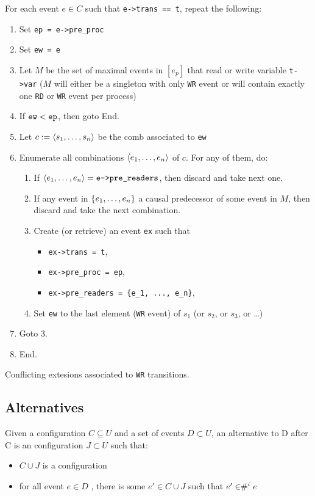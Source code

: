 \documentclass{llncs}
\begin{document}
\begin{algorithm}
\noindent
For each event $e \in C$ such that \verb!e->trans == t!, repeat the following:
\begin{enumerate}
\item Set \verb!ep = e->pre_proc!
\item Set \verb!ew = e!
\item
  Let $M$ be the set of maximal events in $[e_p]$ that read or write variable
  \verb!t->var! ($M$ will either be a singleton with only \verb!WR! event or
  will contain exactly one \verb!RD! or \verb!WR! event per process)
\item If $\verb!ew! < \verb!ep!$, then goto End.
\item Let $c \mathrel{:=} \langle s_1, \ldots, s_n\rangle$ be the comb associated to \verb!ew!
\item
  Enumerate all combinations $\langle e_1, \ldots, e_n\rangle$ of $c$.
  For any of them, do:
  \begin{enumerate}
  \item
    If $\tup{e_1, \ldots, e_n} = \verb!e->pre_readers!$, then discard and take
    next one.
  \item
    If any event in ${\{ e_1, \ldots, e_n \mathclose \}}$ a causal predecessor of some event in
    $M$, then discard and take the next combination.
  \item
    Create (or retrieve) an event \verb!ex! such that
    \begin{itemize}
    \item \verb!ex->trans = t!,
    \item \verb!ex->pre_proc = ep!,
    \item \verb!ex->pre_readers = {e_1, ..., e_n}!,
    \end{itemize}
  \item
    Set \verb!ew! to the last element (\verb!WR! event) of $s_1$
    (or $s_2$, or $s_3$, or \ldots)
  \end{enumerate}
\item Goto 3.
\item End.
\end{enumerate}
\caption{Conflicting extesions associated to \texttt{WR} transitions.}
\label{a:cex_wr}
\end{algorithm}

\subsection{Alternatives}
\begin{definition}
Given a configuration $C \subseteq U$ and a set of events $D \subset U$, an alternative to D after C is an configuration $J \subset U $ such that:
\begin{itemize}
\item 
	$C \cup J$ is a configuration
\item
	for all event $e \in D$ , there is some $e'\in C \cup J$ such that $e' \in  \mathrel{\#^i_{}}{e}$
\end{itemize}
\end{definition}
\end{document}
